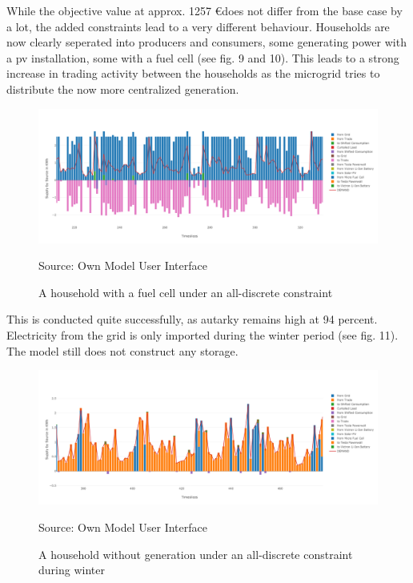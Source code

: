 \documentclass[
	11pt,								%
	DIV10,								%
	a4paper,         					%
	oneside,							%
	headheight=20pt,					%
	footheight=20pt,					%
    parskip=full,						%
    listof=totoc,						%
	bibliography=totoc,					%
	index=totoc,						%
]{scrartcl}
\begin{document}
	While the objective value at approx. 1257 \euro does not differ from the base case by a lot, the added constraints lead to a very different behaviour. Households are now clearly seperated into producers and consumers, some generating power with a pv installation, some with a fuel cell (see fig. 9 and 10). This leads to a strong increase in trading activity between the households as the microgrid tries to distribute the now more centralized generation.
	
\begin{figure}[H]
	\centering
	\includegraphics[width=1\textwidth]{pictures/RES_8_DISC.png}
	\caption{A household with a fuel cell under an all-discrete constraint}
	\label{commercial_dispatch_base}
	\flushleft\quad\quad\footnotesize{Source: Own Model User Interface}
\end{figure}	
This is conducted quite successfully, as autarky remains high at 94 percent. Electricity from the grid is only imported during the winter period (see fig. 11). The model still does not construct any storage.

\begin{figure}[H]
	\centering
	\includegraphics[width=1\textwidth]{pictures/RES_6_DISC.png}
	\caption{A household without generation under an all-discrete constraint during winter}
	\label{commercial_dispatch_base}
	\flushleft\quad\quad\footnotesize{Source: Own Model User Interface}
\end{figure}	
\end{document}
